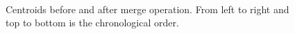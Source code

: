 \documentclass[a4paper, 12pt, titlepage]{article}
\begin{document}
\begin{figure}
	\\
	\caption{Centroids before and after merge operation. From left to right and top to bottom is the chronological order.}
	\label{fig:uspsMerges}
\end{figure}
\end{document}

